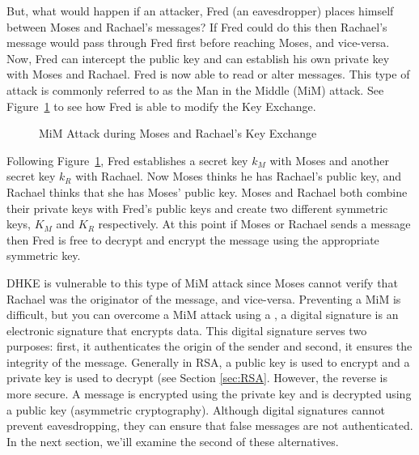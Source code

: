 But, what would happen if an attacker, Fred (an eavesdropper) places himself between Moses and Rachael's messages?  If Fred could do this then Rachael's message would pass through Fred first before reaching Moses, and vice-versa. Now, Fred can intercept the public key and can establish his own private key with Moses and Rachael.  Fred is now able to read or alter messages.  This type of attack is commonly referred to as the Man in the Middle (MiM) attack.  See Figure~\ref{fig:DH:DHKE_2} to see how Fred is able to modify the Key Exchange.
\begin{figure}[H]
	  \caption{\label{fig:DH:DHKE_2} MiM Attack during Moses and Rachael's Key Exchange }
\end{figure}

Following Figure~\ref{fig:DH:DHKE_2}, Fred establishes a secret key $k_M$ with Moses and another secret key $k_R$ with Rachael.  Now Moses thinks he has Rachael's public key, and Rachael thinks that she has Moses' public key. Moses and Rachael both combine their private keys with Fred's public keys and create two different symmetric keys, $K_M$ and $K_R$ respectively. At this point if Moses or Rachael sends a message then Fred is free to decrypt and encrypt the message using the appropriate symmetric key. 

DHKE is vulnerable to this type of MiM attack since Moses cannot verify that Rachael was the originator of the message, and vice-versa.  Preventing a MiM is difficult, but you can overcome a MiM attack using a , a digital signature is an electronic signature that encrypts data.  This digital signature serves two purposes: first, it authenticates the origin of the sender and second, it ensures the integrity of the message.  Generally in RSA, a public key is used to encrypt and a private key is used to decrypt (see Section \ref{sec:RSA}.  However, the reverse is more secure.  A message is encrypted using the private key and is decrypted using a public key (asymmetric cryptography). Although digital signatures cannot prevent eavesdropping, they can ensure that false messages are not authenticated. In the next section, we'ill examine the second of these alternatives. 

